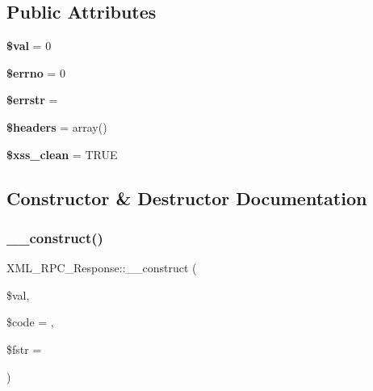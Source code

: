 \subsection*{Public Attributes}
\begin{DoxyCompactItemize}
\item 
\mbox{\label{class_x_m_l___r_p_c___response_a2cd900a9643190ae22e69d13644bb4ec}} 
{\bfseries \$val} = 0
\item 
\mbox{\label{class_x_m_l___r_p_c___response_aa5a278154222f53e20d7ca4a9e70c482}} 
{\bfseries \$errno} = 0
\item 
\mbox{\label{class_x_m_l___r_p_c___response_af5825068aef35442f80ac498c532f62a}} 
{\bfseries \$errstr} = \textquotesingle{}\textquotesingle{}
\item 
\mbox{\label{class_x_m_l___r_p_c___response_ab104a4ac7e2b1c5cb92243a82256bc5d}} 
{\bfseries \$headers} = array()
\item 
\mbox{\label{class_x_m_l___r_p_c___response_af2e0838cd41026e948c1e212691472cc}} 
{\bfseries \$xss\+\_\+clean} = T\+R\+UE
\end{DoxyCompactItemize}


\subsection{Constructor \& Destructor Documentation}
\mbox{\label{class_x_m_l___r_p_c___response_a9e21d1002acc9528b7c79a30932be3c7}} 
\subsubsection{\texorpdfstring{\+\_\+\+\_\+construct()}{\_\_construct()}}
{\footnotesize\ttfamily X\+M\+L\+\_\+\+R\+P\+C\+\_\+\+Response\+::\+\_\+\+\_\+construct (\begin{DoxyParamCaption}\item[{}]{\$val,  }\item[{}]{\$code = {},  }\item[{}]{\$fstr = {\ttfamily \textquotesingle{}\textquotesingle{}} }\end{DoxyParamCaption})}

